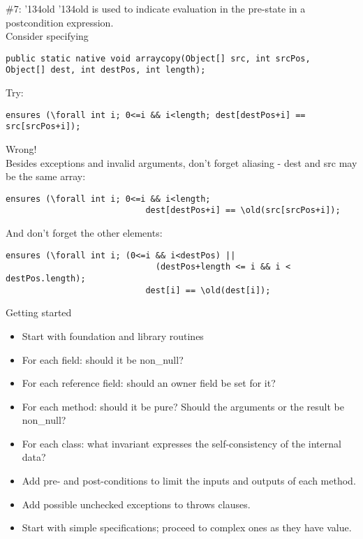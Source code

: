 \documentclass[
pdf,
nocolorBG,
slideColor,
cok,
]{prosper}
\newcommand{\bsl}{\char'134}
\newcommand{\old}{\bsl old}
\begin{document}
\begin{slide}{\#7: \old}
\vspace*{-6ex}
{\knalblue \old} is used to indicate evaluation in the pre-state in a postcondition expression.\\
\vspace{1ex}
Consider specifying
{\tiny
\begin{verbatim} 
public static native void arraycopy(Object[] src, int srcPos,                                    Object[] dest, int destPos, int length);
\end{verbatim}
}
Try:
{\tiny
\begin{verbatim} 
ensures (\forall int i; 0<=i && i<length; dest[destPos+i] == src[srcPos+i]);
\end{verbatim}
}

{\red
Wrong!}\\
\vspace{1ex}
Besides exceptions and invalid arguments, don't forget aliasing - {\blue dest} and {\blue src} may be the same array:
{\tiny
\begin{verbatim} 
ensures (\forall int i; 0<=i && i<length; 
                            dest[destPos+i] == \old(src[srcPos+i]);
\end{verbatim}
}
And don't forget the other elements:
{\tiny
\begin{verbatim} 
ensures (\forall int i; (0<=i && i<destPos) || 
                              (destPos+length <= i && i < destPos.length); 
                            dest[i] == \old(dest[i]);
\end{verbatim}
}



\end{slide}


\begin{slide}{Getting started}
\vspace*{-6ex}
\begin{itemize}
\item Start with foundation and library routines
\item For each field: should it be {\knalblue non\_null}?
\item For each reference field: should an {\knalblue owner} field be set for it?
\item For each method: should it be {\knalblue pure}?  Should the arguments or the result be {\knalblue non\_null}?
\item For each class: what {\knalblue invariant} expresses the self-consistency of the internal data?
\item Add {\knalblue pre-} and {\knalblue post-conditions} to limit the inputs and outputs of each method.
\item Add possible unchecked {\knalblue exceptions} to throws clauses.
\item Start with simple specifications; proceed to complex ones as they have value.
\end{itemize}

\end{slide}
\end{document}
